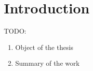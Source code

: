 \chapter{Introduction}

TODO:
\begin{enumerate}
    \item Object of the thesis
    \item Summary of the work
\end{enumerate}